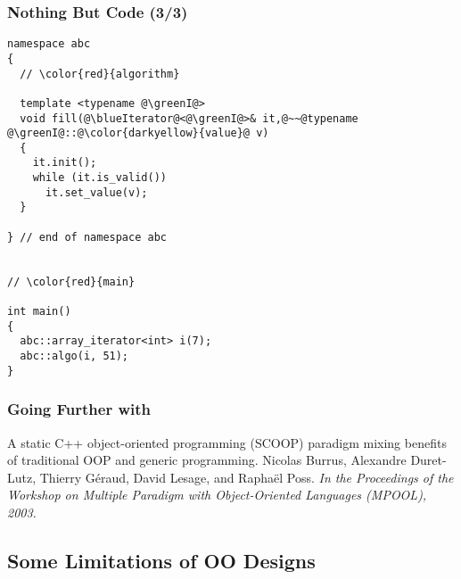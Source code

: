 \begin{frame}[fragile]
  \frametitle{Nothing But Code (3/3)}

%
\begin{lstlisting}[escapechar=@,basicstyle={\tiny\sffamily}]
namespace abc
{
  // \color{red}{algorithm}

  template <typename @\greenI@>
  void fill(@\blueIterator@<@\greenI@>& it,@~~@typename @\greenI@::@\color{darkyellow}{value}@ v)
  {
    it.init();
    while (it.is_valid())
      it.set_value(v);
  }

} // end of namespace abc


// \color{red}{main}

int main()
{
  abc::array_iterator<int> i(7);
  abc::algo(i, 51);
}

\end{lstlisting}
%

\end{frame}



\begin{frame}[fragile]
  \frametitle{Going Further with }

%
  {\small A static {C++} object-oriented programming ({SCOOP})
    paradigm mixing benefits of traditional {OOP} and generic
    programming.
  }
%
  {\scriptsize Nicolas Burrus, Alexandre Duret-Lutz, Thierry G\'eraud,
    David Lesage, and Rapha\"el Poss.  \textit{In the Proceedings of
      the Workshop on Multiple Paradigm with Object-Oriented Languages
      (MPOOL), 2003.}  }
%
  
  \medskip

%
  {\scriptsize
  }
%

\end{frame}





\subsection{Some Limitations of OO Designs}



